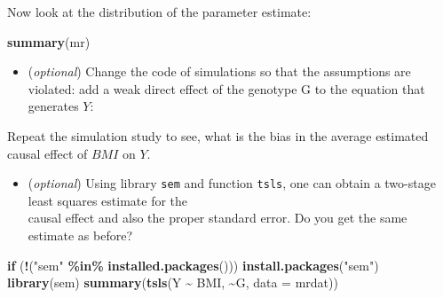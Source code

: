 \documentclass[
]{book}
\newenvironment{Shaded}{\begin{snugshade}}{\end{snugshade}}
\newcommand{\AttributeTok}[1]{\textcolor[rgb]{0.13,0.29,0.53}{#1}}
\newcommand{\ControlFlowTok}[1]{\textcolor[rgb]{0.13,0.29,0.53}{\textbf{#1}}}
\newcommand{\DecValTok}[1]{\textcolor[rgb]{0.00,0.00,0.81}{#1}}
\newcommand{\FloatTok}[1]{\textcolor[rgb]{0.00,0.00,0.81}{#1}}
\newcommand{\FunctionTok}[1]{\textcolor[rgb]{0.13,0.29,0.53}{\textbf{#1}}}
\newcommand{\NormalTok}[1]{#1}
\newcommand{\OtherTok}[1]{\textcolor[rgb]{0.56,0.35,0.01}{#1}}
\newcommand{\SpecialCharTok}[1]{\textcolor[rgb]{0.81,0.36,0.00}{\textbf{#1}}}
\newcommand{\StringTok}[1]{\textcolor[rgb]{0.31,0.60,0.02}{#1}}
\providecommand{\tightlist}{%
  \setlength{\itemsep}{0pt}\setlength{\parskip}{0pt}}
\begin{document}
Now look at the distribution of the parameter estimate:

\begin{Shaded}
\begin{Highlighting}[]
\FunctionTok{summary}\NormalTok{(mr)}
\end{Highlighting}
\end{Shaded}

\begin{itemize}
\tightlist
\item
  (\emph{optional}) Change the code of simulations so that the assumptions are violated: add a weak direct effect of the genotype G to the equation that generates \(Y\):
\end{itemize}

\begin{Shaded}
\end{Shaded}

Repeat the simulation study to see, what is the bias in the average estimated causal effect of \(BMI\) on \(Y\).

\begin{itemize}
\tightlist
\item
  (\emph{optional}) Using library \texttt{sem} and function \texttt{tsls}, one can obtain a two-stage least squares estimate for the\\
  causal effect and also the proper standard error. Do you get the same estimate as before?
\end{itemize}

\begin{Shaded}
\begin{Highlighting}[]
\ControlFlowTok{if}\NormalTok{ (}\SpecialCharTok{!}\NormalTok{(}\StringTok{"sem"} \SpecialCharTok{\%in\%} \FunctionTok{installed.packages}\NormalTok{())) }\FunctionTok{install.packages}\NormalTok{(}\StringTok{"sem"}\NormalTok{)}
\FunctionTok{library}\NormalTok{(sem)}
\FunctionTok{summary}\NormalTok{(}\FunctionTok{tsls}\NormalTok{(Y }\SpecialCharTok{\textasciitilde{}}\NormalTok{ BMI, }\SpecialCharTok{\textasciitilde{}}\NormalTok{G, }\AttributeTok{data =}\NormalTok{ mrdat))}
\end{Highlighting}
\end{Shaded}
\end{document}
